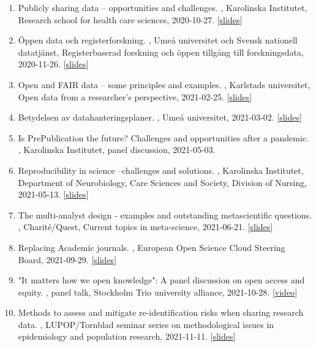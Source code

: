 \documentclass[10pt,a4paper,twocolumn]{article}
\begin{document}
\begin{enumerate}
    \item Publicly sharing data – opportunities and challenges. , Karolinska Institutet, Research school for health care sciences, 2020-10-27. [\href{https://osf.io/tp37s/}{slides}]

    \item Öppen data och registerforskning. , Umeå universitet och Svensk nationell datatjänst, Registerbaserad forskning och öppen tillgång till forskningsdata, 2020-11-26. [\href{https://osf.io/sfn4v/}{slides}]

    \item Open and FAIR data – some principles and examples. , Karlstads universitet, Open data from a researcher's perspective, 2021-02-25. [\href{https://osf.io/3at4s/}{slides}]

    \item Betydelsen av datahanteringsplaner. , Umeå universitet, 2021-03-02. [\href{https://osf.io/nmdp4/}{slides}]

    \item Is PrePublication the future? Challenges and opportunities after a pandemic. , Karolinska Institutet, panel discussion, 2021-05-03.

    \item Reproducibility in science –challenges and solutions. , Karolinska Institutet, Department of Neurobiology, Care Sciences and Society, Division of Nursing, 2021-05-13. [\href{https://osf.io/9uw4x/}{slides}]

    \item The multi-analyst design - examples and outstanding metascientific questions. , Charité/Quest, Current topics in meta-science, 2021-06-21. [\href{https://osf.io/yprkw/}{slides}]

    \item Replacing Academic journals. , European Open Science Cloud Steering Board, 2021-09-29. [\href{https://osf.io/uktqb/}{slides}]

    \item "It matters how we open knowledge": A panel discussion on open access and equity. , panel talk, Stockholm Trio university alliance, 2021-10-28. [\href{https://www.youtube.com/watch?v=6oZbVTqhX5o}{video}]

    \item Methods to assess and mitigate re-identification risks when sharing research data. , LUPOP/Tornblad seminar series on methodological issues in epidemiology and population research, 2021-11-11. [\href{https://osf.io/7xenk/}{slides}]


\end{enumerate}
\end{document}
